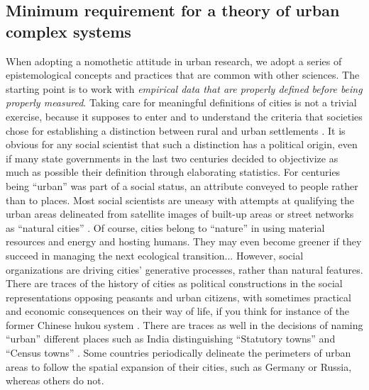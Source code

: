 \documentclass[10pt]{article}
\begin{document}
\subsection{Minimum requirement for a theory of urban complex systems}

When adopting a nomothetic attitude in urban research, we adopt a series of epistemological concepts and practices that are common with other sciences. The starting point is to work with \textit{empirical data that are properly defined before being properly measured}. Taking care for meaningful definitions of cities is not a trivial exercise, because it supposes to enter and to understand the criteria that societies chose for establishing a distinction between rural and urban settlements \citep{rozenblat2020extending}. It is obvious for any social scientist that such a distinction has a political origin, even if many state governments in the last two centuries decided to objectivize as much as possible their definition through elaborating statistics. For centuries being ``urban'' was part of a social status, an attribute conveyed to people rather than to places. Most social scientists are uneasy with attempts at qualifying the urban areas delineated from satellite images of built-up areas or street networks as ``natural cities'' \citep{jiang2015zipf}. Of course, cities belong to ``nature'' in using material resources and energy and hosting humans. They may even become greener if they succeed in managing the next ecological transition... However, social organizations are driving cities' generative processes, rather than natural features. There are traces of the history of cities as political constructions in the social representations opposing peasants and urban citizens, with sometimes practical and economic consequences on their way of life, if you think for instance of the former Chinese hukou system \citep{wu2020emerging}. There are traces as well in the decisions of naming ``urban'' different places such as India distinguishing ``Statutory towns'' and ``Census towns'' \citep{swerts2018diffuse}. Some countries periodically delineate the perimeters of urban areas to follow the spatial expansion of their cities, such as Germany or Russia, whereas others do not.
\end{document}
